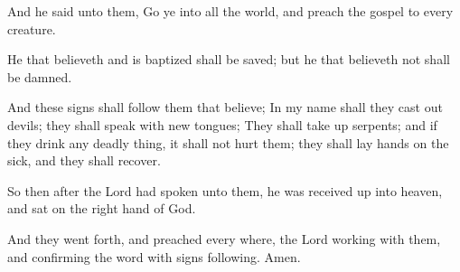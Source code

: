 \Verse And he said unto them, Go ye into all the world, and preach the gospel to every creature.

\Verse He that believeth and is baptized shall be saved; but he that believeth not shall be damned.

\Verse And these signs shall follow them that believe; In my name shall they cast out devils; they shall speak with new tongues; \Verse They shall take up serpents; and if they drink any deadly thing, it shall not hurt them; they shall lay hands on the sick, and they shall recover.

\Verse So then after the Lord had spoken unto them, he was received up into heaven, and sat on the right hand of God.

\Verse And they went forth, and preached every where, the Lord working with them, and confirming the word with signs following. Amen.

